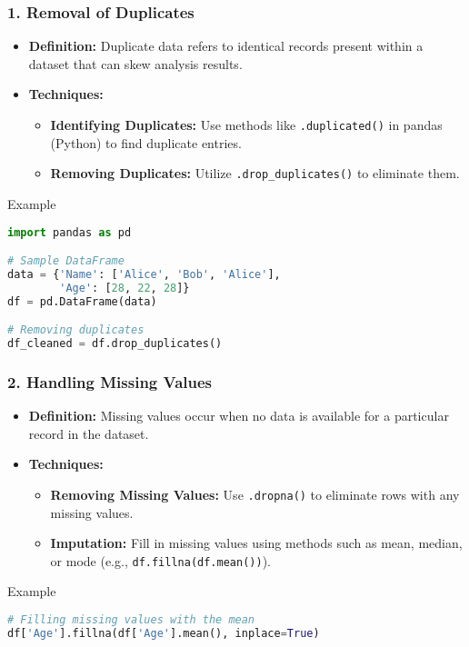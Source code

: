 \documentclass[aspectratio=169]{beamer}
\begin{document}
\begin{frame}[fragile]
    \frametitle{1. Removal of Duplicates}
    \begin{itemize}
        \item \textbf{Definition:} Duplicate data refers to identical records present within a dataset that can skew analysis results.
        \item \textbf{Techniques:}
        \begin{itemize}
            \item \textbf{Identifying Duplicates:} Use methods like \texttt{.duplicated()} in pandas (Python) to find duplicate entries.
            \item \textbf{Removing Duplicates:} Utilize \texttt{.drop\_duplicates()} to eliminate them.
        \end{itemize}
    \end{itemize}
    \begin{block}{Example}
    \begin{lstlisting}[language=Python]
import pandas as pd

# Sample DataFrame
data = {'Name': ['Alice', 'Bob', 'Alice'],
        'Age': [28, 22, 28]}
df = pd.DataFrame(data)

# Removing duplicates
df_cleaned = df.drop_duplicates()
    \end{lstlisting}
    \end{block}
\end{frame}

\begin{frame}[fragile]
    \frametitle{2. Handling Missing Values}
    \begin{itemize}
        \item \textbf{Definition:} Missing values occur when no data is available for a particular record in the dataset.
        \item \textbf{Techniques:}
        \begin{itemize}
            \item \textbf{Removing Missing Values:} Use \texttt{.dropna()} to eliminate rows with any missing values.
            \item \textbf{Imputation:} Fill in missing values using methods such as mean, median, or mode (e.g., \texttt{df.fillna(df.mean())}).
        \end{itemize}
    \end{itemize}
    \begin{block}{Example}
    \begin{lstlisting}[language=Python]
# Filling missing values with the mean
df['Age'].fillna(df['Age'].mean(), inplace=True)
    \end{lstlisting}
    \end{block}
\end{frame}
\end{document}
